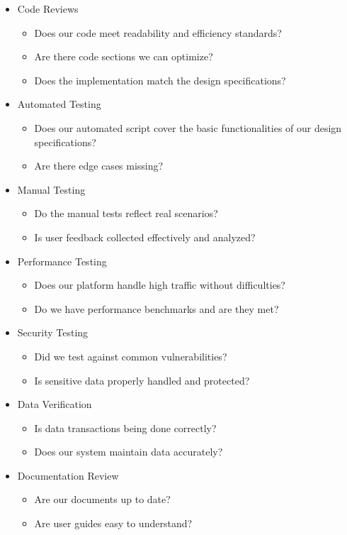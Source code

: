 \documentclass[12pt, titlepage]{article}
\begin{document}
\begin{itemize}
    \item Code Reviews
          \begin{itemize}
              \item Does our code meet readability and efficiency standards?
              \item Are there code sections we can optimize?
              \item Does the implementation match the design specifications?
          \end{itemize}
    \item Automated Testing
          \begin{itemize}
              \item Does our automated script cover the basic functionalities of our design specifications?
              \item Are there edge cases missing?
          \end{itemize}
    \item Manual Testing
          \begin{itemize}
              \item Do the manual tests reflect real scenarios?
              \item Is user feedback collected effectively and analyzed?
          \end{itemize}
    \item Performance Testing
          \begin{itemize}
              \item Does our platform handle high traffic without difficulties?
              \item Do we have performance benchmarks and are they met?
          \end{itemize}
    \item Security Testing
          \begin{itemize}
              \item Did we test against common vulnerabilities?
              \item Is sensitive data properly handled and protected?
          \end{itemize}
    \item Data Verification
          \begin{itemize}
              \item Is data transactions being done correctly?
              \item Does our system maintain data accurately?
          \end{itemize}
    \item Documentation Review
          \begin{itemize}
              \item Are our documents up to date?
              \item Are user guides easy to understand?
          \end{itemize}
\end{itemize}
\end{document}

